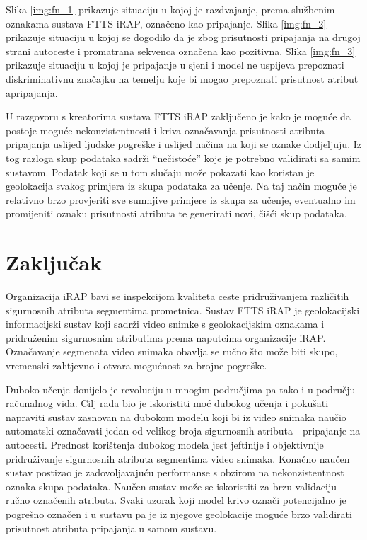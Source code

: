 \documentclass[times, utf8, diplomski, numeric]{fer}
\begin{document}
Slika \ref{img:fn_1} prikazuje situaciju u kojoj je razdvajanje, prema službenim oznakama sustava FTTS iRAP, označeno kao pripajanje. 
Slika \ref{img:fn_2} prikazuje situaciju u kojoj se dogodilo da je zbog prisutnosti pripajanja na drugoj strani autoceste i promatrana sekvenca označena kao pozitivna.
Slika \ref{img:fn_3} prikazuje situaciju u kojoj je pripajanje u sjeni i model ne uspijeva prepoznati diskriminativnu značajku na temelju koje bi mogao prepoznati prisutnost atribut apripajanja.

U razgovoru s kreatorima sustava FTTS iRAP zaključeno je kako je moguće da postoje moguće nekonzistentnosti i kriva označavanja prisutnosti atributa pripajanja uslijed ljudske pogreške i uslijed načina na koji se oznake dodjeljuju.
Iz tog razloga skup podataka sadrži ``nečistoće'' koje je potrebno validirati sa samim sustavom. 
Podatak koji se u tom slučaju može pokazati kao koristan je geolokacija svakog primjera iz skupa podataka za učenje.
Na taj način moguće je relativno brzo provjeriti sve sumnjive primjere iz skupa za učenje, eventualno im promijeniti oznaku prisutnosti atributa te generirati novi, čišći skup podataka.

\chapter{Zaključak}
Organizacija iRAP bavi se inspekcijom kvaliteta ceste pridruživanjem različitih sigurnosnih atributa segmentima prometnica. 
Sustav FTTS iRAP je geolokacijski informacijski sustav koji sadrži video snimke s geolokacijskim oznakama i pridruženim sigurnosnim atributima prema naputcima organizacije iRAP. 
Označavanje segmenata video snimaka obavlja se ručno što može biti skupo, vremenski zahtjevno i otvara mogućnost za brojne pogreške. 

Duboko učenje donijelo je revoluciju u mnogim područjima pa tako i u području računalnog vida. 
Cilj rada bio je iskoristiti moć dubokog učenja i pokušati napraviti sustav zasnovan na dubokom modelu koji bi iz video snimaka naučio automatski označavati jedan od velikog broja sigurnosnih atributa - pripajanje na autocesti. 
Prednost korištenja dubokog modela jest jeftinije i objektivnije pridruživanje sigurnosnih atributa segmentima video snimaka. 
Konačno naučen sustav postizao je zadovoljavajuću performanse s obzirom na nekonzistentnost oznaka skupa podataka. 
Naučen sustav može se iskoristiti za brzu validaciju ručno označenih atributa. 
Svaki uzorak koji model krivo označi potencijalno je pogrešno označen i u sustavu pa je iz njegove geolokacije moguće brzo validirati prisutnost atributa pripajanja u samom sustavu.
\end{document}
